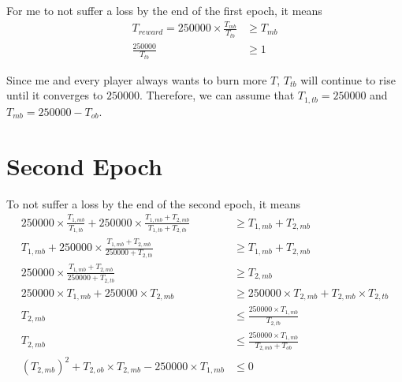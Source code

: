 \documentclass{article}
\begin{document}
For me to not suffer a loss by the end of the first epoch, it means 
\begin{align}
    T_{reward} = \num{250000} \times \frac{T_{mb}}{T_{tb}} & \ge T_{mb} \\
    \frac{\num{250000}}{T_{tb}} & \ge 1
\end{align}

Since me and every player always wants to burn more $T$, $T_{tb}$ will continue to rise until it converges to $\num{250000}$.
Therefore, we can assume that $T_{1,tb} = \num{250000}$ and $T_{mb} = \num{250000} - T_{ob}$.

\section*{Second Epoch}
To not suffer a loss by the end of the second epoch, it means 
\begin{align}
    \num{250000} \times \frac{T_{1,mb}}{T_{1,tb}} + \num{250000} \times \frac{T_{1,mb} + T_{2,mb}}{T_{1,tb} + T_{2,tb}} & \ge T_{1,mb} + T_{2,mb} \\
    T_{1,mb} + \num{250000} \times \frac{T_{1,mb} + T_{2,mb}}{\num{250000} + T_{2,tb}} & \ge T_{1,mb} + T_{2,mb} \\
    \num{250000} \times \frac{T_{1,mb} + T_{2,mb}}{\num{250000} + T_{2,tb}} & \ge T_{2,mb} \\
    \num{250000} \times T_{1,mb} + \num{250000} \times T_{2,mb} & \ge \num{250000} \times T_{2,mb} + T_{2,mb} \times T_{2,tb} \\
    T_{2,mb} & \le \frac{\num{250000} \times T_{1,mb}}{T_{2,tb}} \\
    T_{2,mb} & \le \frac{\num{250000} \times T_{1,mb}}{T_{2,mb} + T_{ob}} \\
    (T_{2,mb})^2 + T_{2,ob} \times T_{2,mb} -\num{250000} \times T_{1,mb} & \le 0
\end{align}
\end{document}
